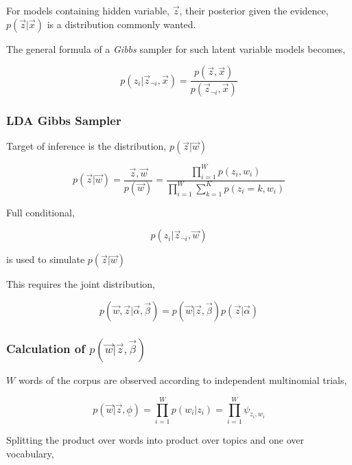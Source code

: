 For models containing hidden variable, \(\vec{z}\), their posterior given the evidence, \(p(\vec{z}|\vec{x})\) is a distribution commonly
wanted. 

The general formula of a \textit{Gibbs} sampler for such latent variable models becomes, 

\begin{equation}
 p(z_i|\vec{z}_{\neg i},\vec{x}) = \frac{p(\vec{z},\vec{x})}{p(\vec{z}_{\neg i},\vec{x})}
\end{equation}

\subsubsection*{LDA Gibbs Sampler}

Target of inference is the distribution, \(p(\vec{z}|\vec{w})\)

\begin{equation}
 p(\vec{z}|\vec{w}) = \frac{\vec{z},\vec{w}}{p(\vec{w})} = \frac{\prod_{i=1}^{W} p(z_i,w_i)}{\prod_{i=1}^{W} \sum_{k=1}^{K} p(z_i=k,w_i)}
\end{equation}

Full conditional, 

\begin{equation}\label{eqn:fullconditionalincomplete}
p(z_i|\vec{z}_{\neg i},\vec{w}) 
\end{equation}

is used to simulate \(p(\vec{z}|\vec{w})\)

This requires the joint distribution, 

\begin{equation}
p(\vec{w},\vec{z}|\vec{\alpha},\vec{\beta}) = p(\vec{w}|\vec{z},\vec{\beta})p(\vec{z}|\vec{\alpha})\label{eqn:wzgivenalphbetaincomplete}
\end{equation}

\subsubsection*{Calculation of \(p(\vec{w}|\vec{z},\vec{\beta})\)}

\(W\) words of the corpus are observed according to independent multinomial trials,

\begin{equation}
 p(\vec{w}|\vec{z},\underline{\phi}) = \prod_{i=1}^{W} p(w_i|z_i) = \prod_{i=1}^{W} \psi_{z_i,w_i}
\end{equation}

Splitting the product over words into product over topics and one over vocabulary,

